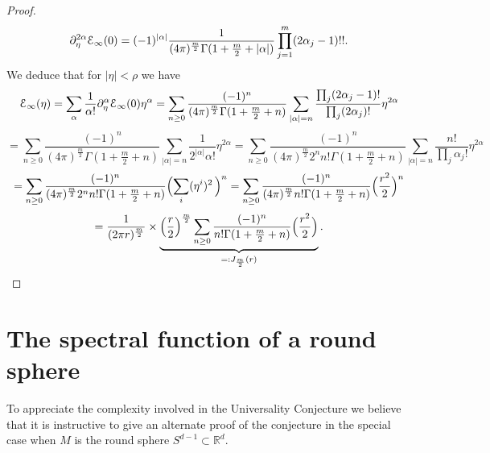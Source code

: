 \documentclass[reqno, 11pt]{amsart}
\theoremstyle{definition}
\numberwithin{equation}{section}
\begin{document}
\begin{proof}
\begin{equation}
{\partial}^{2\alpha}_\eta{\EuScript{E}}_\infty(0)=(-1)^{|\alpha|} \frac{1}{(4\pi)^{\frac{m}{2}} \Gamma( 1+\frac{m}{2}+|\alpha|)}\prod_{j=1}^m (2\alpha_j-1)!!.
\label{eq: 2}
\end{equation}
We deduce that for $|\eta|<\rho$ we have
\[
{\EuScript{E}}_\infty(\eta)=\sum_\alpha \frac{1}{\alpha!}{\partial}^\alpha_\eta {\EuScript{E}}_\infty(0)\eta^\alpha=\sum_{n\geq 0}  \frac{(-1)^n}{(4\pi)^{\frac{m}{2}} \Gamma( 1+\frac{m}{2}+n)}\sum_{|\alpha|=n}\frac{\prod_j(2\alpha_j-1)!}{\prod_j  (2\alpha_j)!} \eta^{2\alpha}
\]
\[
=\sum_{n\geq 0}  \frac{(-1)^n}{(4\pi)^{\frac{m}{2}} \Gamma( 1+\frac{m}{2}+n)}\sum_{|\alpha|=n}\frac{1}{2^{|\alpha|} \alpha!} \eta^{2\alpha}=\sum_{n\geq 0}  \frac{(-1)^n}{(4\pi)^{\frac{m}{2} } 2^n n!\Gamma( 1+\frac{m}{2}+n)}\sum_{|\alpha|=n}\frac{n!}{\prod_j \alpha_j!} \eta^{2\alpha}
\]
\[
=\sum_{n\geq 0}  \frac{(-1)^n}{(4\pi)^{\frac{m}{2} } 2^n n!\Gamma( 1+\frac{m}{2}+n)}\Bigl(\sum_i(\eta^i)^2\,\Bigr)^n=\sum_{n\geq 0}  \frac{(-1)^n}{(4\pi)^{\frac{m}{2} } n!\Gamma( 1+\frac{m}{2}+n)}\Bigl(\frac{r^2}{2}\Bigr)^n
\]
\[
=\frac{1}{(2\pi r)^{\frac{m}{2}} }\times \underbrace{ \Bigl(\frac{r}{2}\Bigr)^{\frac{m}{2}}\sum_{n\geq 0}  \frac{(-1)^n}{n!\Gamma( 1+\frac{m}{2}+n)}\Bigl(\frac{r^2}{2}\Bigr)}_{=: J_{\frac{m}{2}}(r)}.
\]
\end{proof}

\section{The spectral function of a round sphere}
\setcounter{equation}{0}
\label{s:   sph}

To appreciate the complexity involved in the Universality Conjecture we believe  that it is instructive to give an alternate proof of the conjecture in the special case when $M$ is   the round sphere $S^{d-1}\subset {{\mathbb R}}^d$.  
\end{document}
